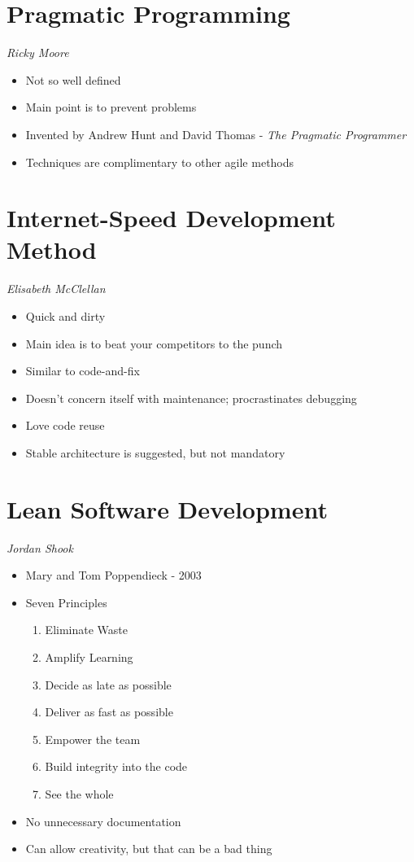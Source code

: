 \documentclass{report}
\begin{document}
		\section{Pragmatic Programming}
			\textit{Ricky Moore}
			\begin{itemize}
				\item Not so well defined
				\item Main point is to prevent problems
				\item Invented by Andrew Hunt and David Thomas - \textit{The Pragmatic Programmer}
				\item Techniques are complimentary to other agile methods
			\end{itemize}
		\section{Internet-Speed Development Method}
			\textit{Elisabeth McClellan}
			\begin{itemize}
				\item Quick and dirty
				\item Main idea is to beat your competitors to the punch
				\item Similar to code-and-fix
				\item Doesn't concern itself with maintenance; procrastinates debugging
				\item Love code reuse
				\item Stable architecture is suggested, but not mandatory
			\end{itemize}
		\section{Lean Software Development}
			\textit{Jordan Shook}
			\begin{itemize}
				\item Mary and Tom Poppendieck - 2003
				\item Seven Principles
					\begin{enumerate}
						\item Eliminate Waste
						\item Amplify Learning
						\item Decide as late as possible
						\item Deliver as fast as possible
						\item Empower the team
						\item Build integrity into the code
						\item See the whole
					\end{enumerate}
				\item No unnecessary documentation
				\item Can allow creativity, but that can be a bad thing
			\end{itemize}
\end{document}
